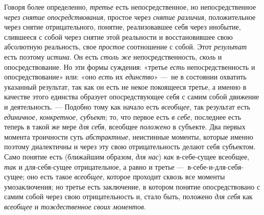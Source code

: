 \documentclass[twoside]{article}
\begin{document}
{{Говоря более определенно,
{\em третье} есть
непосредственное, но непосредственное
{\em через снятие опосредствования},
простое через {\em снятие
различия}, положительное через снятие отрицательного,
понятие, реализовавшее себя через инобытие, слившееся с собой через снятие
этой реальности и восстановившее свою абсолютную реальность, свое
{\em простое} соотношение
с собой. Этот {\em результат}
есть поэтому
{\em истина}. Он есть
{\em столь же}
непосредственность,
{\em сколь} и
опосредствование. Но эти формы суждения: «третье
{\em есть}
непосредственность и опосредствование» или: «оно
{\em есть} их
{\em единство}» —~не в
состоянии охватить указанный результат, так как он есть не некое покоящееся
третье, а именно в качестве этого единства образует опосредствующее себя с
самим собой движение и деятельность. — Подобно тому как
начало есть {\em всеобщее},
так результат есть
{\em единичное, конкретное, субъект};
то, что первое есть {\em в
себе}, последнее есть теперь в такой же мере
{\em для себя}, всеобщее
{\em положено} в
субъекте. Два первых момента троичности суть
{\em абстрактные},
неистинные моменты, которые именно поэтому диалектичны и
через эту свою отрицательность делают себя субъектом. Само понятие есть
(ближайшим образом, {\em для нас})
{\em как} в-себе-сущее
всеобщее, {\em так} и
для-себя-сущее отрицательное, а равно и третье
—~в-себе-и-для-себя-сущее; оно есть такое
{\em всеобщее}, которое
проходит сквозь все моменты умозаключения; но третье есть заключение, в
котором понятие опосредствовано с самим собой через свою отрицательность и,
стало быть, положено {\em для себя}
как {\em всеобщее}
и {\em тождественное своих
моментов}.

}}
\end{document}
